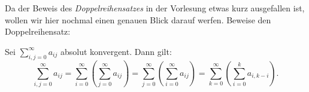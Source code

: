 \begin{exercise}
  Da der Beweis des \emph{Doppelreihensatzes} in der Vorlesung etwas kurz
  ausgefallen ist, wollen wir hier nochmal einen genauen Blick darauf werfen.
  Beweise den Doppelreihensatz:
  \begin{theorem}[Doppelreihensatz]
    Sei $\displaystyle \sum_{i,j=0}^{\infty}a_{ij}$ absolut konvergent. Dann
    gilt:
    \begin{equation*}
      \sum_{i,j=0}^{\infty} a_{ij}
      =
      \sum_{i=0}^{\infty}\left( \sum_{j=0}^{\infty}a_{ij}\right)
      =
      \sum_{j=0}^{\infty}\left( \sum_{i=0}^{\infty}a_{ij}\right)
      =
      \sum_{k=0}^{\infty}\left( \sum_{i=0}^{k}a_{i,k-i}\right).
    \end{equation*}
  \end{theorem}
\end{exercise}
